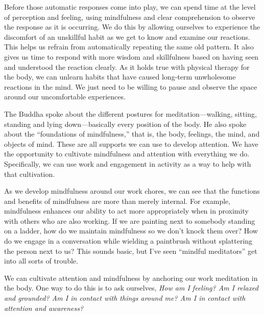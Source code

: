Before those automatic responses come into play, we can spend time at 
the level of perception and feeling, using mindfulness and clear 
comprehension to observe the response as it is occurring. We do this by 
allowing ourselves to experience the discomfort of an unskillful habit 
as we get to know and examine our reactions. This helps us refrain from 
automatically repeating the same old pattern. It also gives us time to 
respond with more wisdom and skillfulness based on having seen and 
understood the reaction clearly. As it holds true with physical therapy 
for the body, we can unlearn habits that have caused long-term 
unwholesome reactions in the mind. We just need to be willing to pause 
and observe the space around our uncomfortable experiences.


The Buddha spoke about the different postures for meditation---walking, 
sitting, standing and lying down---basically every position of the 
body. He also spoke about the ``foundations of mindfulness,'' that is, 
the body, feelings, the mind, and objects of mind. These are all 
supports we can use to develop attention. We have the opportunity to 
cultivate mindfulness and attention with everything we do. 
Specifically, we can use work and engagement in activity as a way to 
help with that cultivation.

As we develop mindfulness around our work chores, we can see that the 
functions and benefits of mindfulness are more than merely internal. 
For example, mindfulness enhances our ability to act more appropriately 
when in proximity with others who are also working. If we are painting 
next to somebody standing on a ladder, how do we maintain mindfulness 
so we don't knock them over? How do we engage in a conversation while 
wielding a paintbrush without splattering the person next to us? This 
sounds basic, but I've seen ``mindful meditators'' get into all sorts 
of trouble.

We can cultivate attention and mindfulness by anchoring our work 
meditation in the body. One way to do this is to ask ourselves, 
\emph{How am I feeling? Am I relaxed and grounded? Am I in contact with 
things around me? Am I in contact with attention and awareness?}

